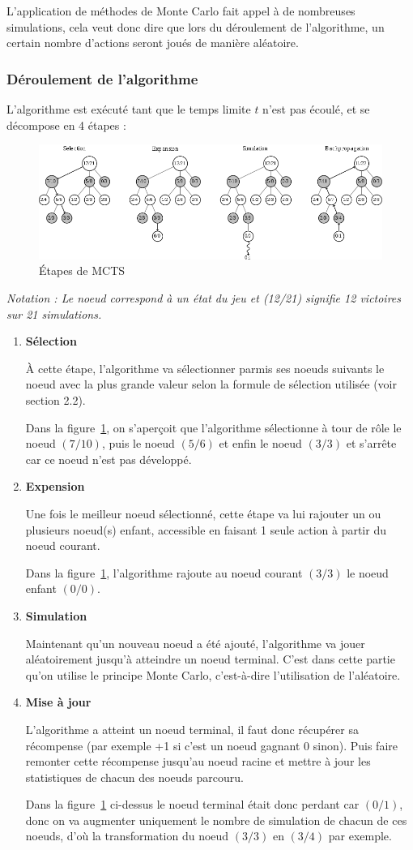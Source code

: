 \documentclass[pdftex,french, english]{article}	%
\begin{document}
	L'application de méthodes de Monte Carlo fait appel à de nombreuses simulations, cela veut donc dire que lors du déroulement de l'algorithme, un certain nombre d'actions seront joués de manière aléatoire.
	\subsubsection{Déroulement de l'algorithme}
	L'algorithme est exécuté tant que le temps limite $t$ n'est pas écoulé, et se décompose en 4 étapes :
	\begin{figure}[h]
		\centering
		\includegraphics[width=\textwidth]{etapes.png}
		\caption{ Étapes de MCTS}
		 \label{fig:mcts}
	\end{figure}

\textit{Notation : Le noeud correspond à un état du jeu et (12/21) signifie 12 victoires sur 21 simulations.} 
	\begin{enumerate}
		\item \textbf{Sélection}

		À cette étape, l'algorithme va sélectionner parmis ses noeuds suivants le noeud avec la plus grande valeur selon la formule de sélection utilisée (voir section 2.2). 

		Dans la figure~\ref{fig:mcts}, on s'aperçoit que l'algorithme sélectionne à tour de rôle le noeud $(7/10)$, puis le noeud $(5/6)$ et enfin le noeud $(3/3)$ et s'arrête car ce noeud n'est pas développé.
		\item \textbf{Expension}

		Une fois le meilleur noeud sélectionné, cette étape va lui rajouter un ou plusieurs noeud(s) enfant, accessible en faisant 1 seule action à partir du noeud courant. 

		Dans la figure~\ref{fig:mcts}, l'algorithme rajoute au noeud courant $(3/3)$ le noeud enfant $(0/0)$.
		\item \textbf{Simulation}

		Maintenant qu'un nouveau noeud a été ajouté, l'algorithme va jouer aléatoirement jusqu'à atteindre un noeud terminal.
		C'est dans cette partie qu'on utilise le principe Monte Carlo, c'est-à-dire l'utilisation de l'aléatoire.
		\item \textbf{Mise à jour} 

		L'algorithme a atteint un noeud terminal, il faut donc récupérer sa récompense (par exemple +1 si c'est un noeud gagnant 0 sinon). Puis faire remonter cette récompense jusqu'au noeud racine et mettre à jour les statistiques de chacun des noeuds parcouru. 

		Dans la figure~\ref{fig:mcts} ci-dessus le noeud terminal était donc perdant car $(0/1)$, donc on va augmenter uniquement le nombre de simulation de chacun de ces noeuds, d'où la transformation du noeud $(3/3)$ en $(3/4)$ par exemple.
	\end{enumerate}
\end{document}
